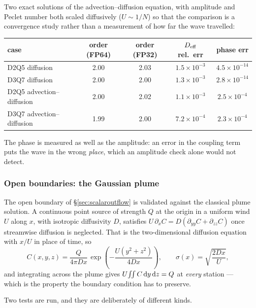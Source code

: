 \documentclass[11pt,a4paper]{article}
\begin{document}
Two exact solutions of the advection--diffusion equation, with amplitude and
Peclet number both scaled diffusively ($U\sim1/N$) so that the comparison is a
convergence study rather than a measurement of how far the wave travelled:

\begin{center}\small
\begin{tabular}{lcccc}
\toprule
case & order (FP64) & order (FP32) & $D_{\rm eff}$ rel.\ err & phase err \\
\midrule
D2Q5 diffusion            & 2.00 & 2.03 & $1.5\times10^{-3}$ & $4.5\times10^{-14}$ \\
D3Q7 diffusion            & 2.00 & 2.00 & $1.3\times10^{-3}$ & $2.8\times10^{-14}$ \\
D2Q5 advection--diffusion & 2.00 & 2.02 & $1.1\times10^{-3}$ & $2.5\times10^{-4}$ \\
D3Q7 advection--diffusion & 1.99 & 2.00 & $7.2\times10^{-4}$ & $2.3\times10^{-4}$ \\
\bottomrule
\end{tabular}
\end{center}

\noindent The phase is measured as well as the amplitude: an error in the
coupling term puts the wave in the wrong \emph{place}, which an amplitude check
alone would not detect.
\subsubsection{Open boundaries: the Gaussian plume}
\label{sec:plume}

The open boundary of \S\ref{sec:scalaroutflow} is validated against the
classical plume solution. A continuous point source of strength $Q$ at the
origin in a uniform wind $U$ along $x$, with isotropic diffusivity $D$,
satisfies $U\,\partial_x C = D(\partial_{yy}C + \partial_{zz}C)$ once
streamwise diffusion is neglected. That is the two-dimensional diffusion
equation with $x/U$ in place of time, so
\begin{equation}
  C(x,y,z) = \frac{Q}{4\pi D x}\,
             \exp\!\left(-\frac{U(y^2+z^2)}{4Dx}\right),
  \qquad \sigma(x) = \sqrt{\frac{2Dx}{U}} ,
  \label{eq:plume}
\end{equation}
and integrating across the plume gives $U\!\iint C\,{\rm d}y\,{\rm d}z = Q$ at
\emph{every} station --- which is the property the boundary condition has to
preserve.

Two tests are run, and they are deliberately of different kinds.
\end{document}
